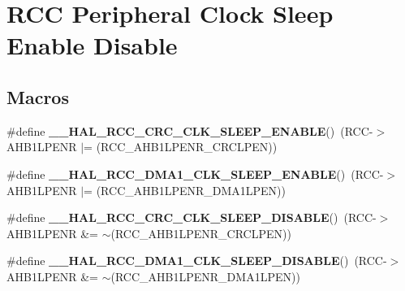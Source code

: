 \hypertarget{group___r_c_c___peripheral___clock___sleep___enable___disable}{}\section{R\+CC Peripheral Clock Sleep Enable Disable}
\label{group___r_c_c___peripheral___clock___sleep___enable___disable}
\subsection*{Macros}
\begin{DoxyCompactItemize}
\item 
\mbox{\label{group___r_c_c___peripheral___clock___sleep___enable___disable_gab9b6703f096a151a86df9d76d4945cda}} 
\#define {\bfseries \+\_\+\+\_\+\+H\+A\+L\+\_\+\+R\+C\+C\+\_\+\+C\+R\+C\+\_\+\+C\+L\+K\+\_\+\+S\+L\+E\+E\+P\+\_\+\+E\+N\+A\+B\+LE}()~(R\+CC-\/$>$A\+H\+B1\+L\+P\+E\+NR $\vert$= (R\+C\+C\+\_\+\+A\+H\+B1\+L\+P\+E\+N\+R\+\_\+\+C\+R\+C\+L\+P\+EN))
\item 
\mbox{\label{group___r_c_c___peripheral___clock___sleep___enable___disable_ga568e4d004285fe009bc4e5d33e13af61}} 
\#define {\bfseries \+\_\+\+\_\+\+H\+A\+L\+\_\+\+R\+C\+C\+\_\+\+D\+M\+A1\+\_\+\+C\+L\+K\+\_\+\+S\+L\+E\+E\+P\+\_\+\+E\+N\+A\+B\+LE}()~(R\+CC-\/$>$A\+H\+B1\+L\+P\+E\+NR $\vert$= (R\+C\+C\+\_\+\+A\+H\+B1\+L\+P\+E\+N\+R\+\_\+\+D\+M\+A1\+L\+P\+EN))
\item 
\mbox{\label{group___r_c_c___peripheral___clock___sleep___enable___disable_gaf63d9f5ce9a6922314054a94ee85eac0}} 
\#define {\bfseries \+\_\+\+\_\+\+H\+A\+L\+\_\+\+R\+C\+C\+\_\+\+C\+R\+C\+\_\+\+C\+L\+K\+\_\+\+S\+L\+E\+E\+P\+\_\+\+D\+I\+S\+A\+B\+LE}()~(R\+CC-\/$>$A\+H\+B1\+L\+P\+E\+NR \&= $\sim$(R\+C\+C\+\_\+\+A\+H\+B1\+L\+P\+E\+N\+R\+\_\+\+C\+R\+C\+L\+P\+EN))
\item 
\mbox{\label{group___r_c_c___peripheral___clock___sleep___enable___disable_ga8786d21490439ef0564edff087203245}} 
\#define {\bfseries \+\_\+\+\_\+\+H\+A\+L\+\_\+\+R\+C\+C\+\_\+\+D\+M\+A1\+\_\+\+C\+L\+K\+\_\+\+S\+L\+E\+E\+P\+\_\+\+D\+I\+S\+A\+B\+LE}()~(R\+CC-\/$>$A\+H\+B1\+L\+P\+E\+NR \&= $\sim$(R\+C\+C\+\_\+\+A\+H\+B1\+L\+P\+E\+N\+R\+\_\+\+D\+M\+A1\+L\+P\+EN))

\end{DoxyCompactItemize}
